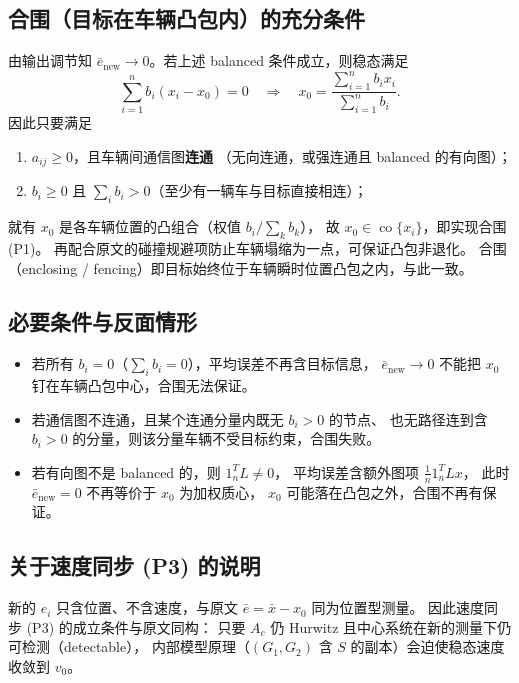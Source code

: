 \subsection{合围（目标在车辆凸包内）的充分条件}

由输出调节知 $\bar e_{\mathrm{new}}\to 0$。若上述 balanced 条件成立，则稳态满足
\[
\sum_{i=1}^n b_i(x_i-x_0)=0
\quad\Longrightarrow\quad
x_0 = \frac{\sum_{i=1}^n b_i x_i}{\sum_{i=1}^n b_i}.
\]
因此只要满足
\begin{enumerate}
  \item $a_{ij}\ge 0$，且车辆间通信图\textbf{连通}
        （无向连通，或强连通且 balanced 的有向图）；
  \item $b_i\ge 0$ 且 $\sum_i b_i > 0$（至少有一辆车与目标直接相连）；
\end{enumerate}
就有 $x_0$ 是各车辆位置的凸组合（权值 $b_i/\sum_k b_k$），
故 $x_0\in\operatorname{co}\{x_i\}$，即实现合围 (P1)。
再配合原文的碰撞规避项防止车辆塌缩为一点，可保证凸包非退化。
合围（enclosing / fencing）即目标始终位于车辆瞬时位置凸包之内，与此一致。

\subsection{必要条件与反面情形}

\begin{itemize}
  \item 若所有 $b_i=0$（$\sum_i b_i=0$），平均误差不再含目标信息，
        $\bar e_{\mathrm{new}}\to0$ 不能把 $x_0$ 钉在车辆凸包中心，合围无法保证。
  \item 若通信图不连通，且某个连通分量内既无 $b_i>0$ 的节点、
        也无路径连到含 $b_i>0$ 的分量，则该分量车辆不受目标约束，合围失败。
  \item 若有向图不是 balanced 的，则 $1_n^TL\ne 0$，
        平均误差含额外图项 $\frac1n 1_n^T L x$，
        此时 $\bar e_{\mathrm{new}}=0$ 不再等价于 $x_0$ 为加权质心，
        $x_0$ 可能落在凸包之外，合围不再有保证。
\end{itemize}

\subsection{关于速度同步 (P3) 的说明}

新的 $e_i$ 只含位置、不含速度，与原文 $\bar e=\bar x-x_0$ 同为位置型测量。
因此速度同步 (P3) 的成立条件与原文同构：
只要 $A_c$ 仍 Hurwitz 且中心系统在新的测量下仍可检测（detectable），
内部模型原理（$(G_1,G_2)$ 含 $S$ 的副本）会迫使稳态速度收敛到 $v_0$。

